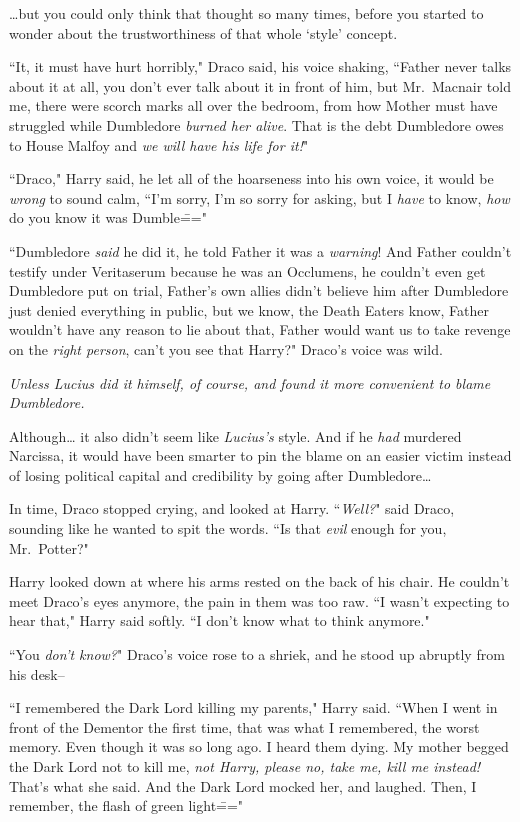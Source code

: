 {\ldots}but you could only think that thought so many times, before you started to wonder about the trustworthiness of that whole `style' concept.

``It, it must have hurt horribly," Draco said, his voice shaking, ``Father never talks about it at all, you don't ever talk about it in front of him, but Mr.~Macnair told me, there were scorch marks all over the bedroom, from how Mother must have struggled while Dumbledore \emph{burned her alive}. That is the debt Dumbledore owes to House Malfoy and \emph{we will have his life for it!}"

``Draco," Harry said, he let all of the hoarseness into his own voice, it would be \emph{wrong} to sound calm, ``I'm sorry, I'm so sorry for asking, but I \emph{have} to know, \emph{how} do you know it was Dumble\==="

``Dumbledore \emph{said} he did it, he told Father it was a \emph{warning}! And Father couldn't testify under Veritaserum because he was an Occlumens, he couldn't even get Dumbledore put on trial, Father's own allies didn't believe him after Dumbledore just denied everything in public, but we know, the Death Eaters know, Father wouldn't have any reason to lie about that, Father would want us to take revenge on the \emph{right person}, can't you see that Harry?" Draco's voice was wild.

\emph{Unless Lucius did it himself, of course, and found it more convenient to blame Dumbledore.}

Although{\ldots} it also didn't seem like \emph{Lucius's} style. And if he \emph{had} murdered Narcissa, it would have been smarter to pin the blame on an easier victim instead of losing political capital and credibility by going after Dumbledore{\ldots}

In time, Draco stopped crying, and looked at Harry. ``\emph{Well?}" said Draco, sounding like he wanted to spit the words. ``Is that \emph{evil} enough for you, Mr.~Potter?"

Harry looked down at where his arms rested on the back of his chair. He couldn't meet Draco's eyes anymore, the pain in them was too raw. ``I wasn't expecting to hear that," Harry said softly. ``I don't know what to think anymore."

``You \emph{don't know?}" Draco's voice rose to a shriek, and he stood up abruptly from his desk\---

``I remembered the Dark Lord killing my parents," Harry said. ``When I went in front of the Dementor the first time, that was what I remembered, the worst memory. Even though it was so long ago. I heard them dying. My mother begged the Dark Lord not to kill me, \emph{not Harry, please no, take me, kill me instead!} That's what she said. And the Dark Lord mocked her, and laughed. Then, I remember, the flash of green light\==="

